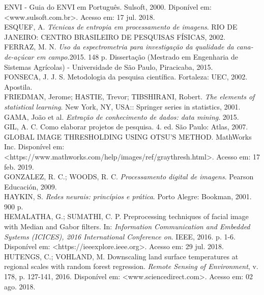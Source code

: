 \noindent ENVI - Guia do ENVI em Português. Sulsoft, 2000. Diponível em: <www.sulsoft.com.br>. Acesso em: 17 jul. 2018.
\\

\noindent ESQUEF, A. \textit{Técnicas de entropia em processamento de imagens}. RIO DE JANEIRO: CENTRO BRASILEIRO DE PESQUISAS FÍSICAS, 2002.
\\

\noindent FERRAZ, M. N. \textit{Uso da espectrometria para investigação da qualidade da cana-de-açúcar em campo.}2015. 148 p. Dissertação (Mestrado em Engenharia de Sistemas Agrícolas) - Universidade de São Paulo, Piracicaba, 2015.
\\

\noindent FONSECA, J. J. S. Metodologia da pesquisa científica. Fortaleza: UEC, 2002. Apostila.
\\

\noindent FRIEDMAN, Jerome; HASTIE, Trevor; TIBSHIRANI, Robert. \textit{The elements of statistical learning}. New York, NY, USA:: Springer series in statistics, 2001.
\\

\noindent GAMA, João et al. \textit{Extração de conhecimento de dados: data mining}. 2015.
\\

\noindent GIL, A. C. Como elaborar projetos de pesquisa. 4. ed. São Paulo: Atlas, 2007.
\\

\noindent GLOBAL IMAGE THRESHOLDING USING OTSU'S METHOD. MathWorks Inc. Disponível em: <https://www.mathworks.com/help/images/ref/graythresh.html>. Acesso em: 17 feb. 2019.
\\

\noindent GONZALEZ, R. C.; WOODS, R. C. \textit{Processamento digital de imagens}. Pearson Educación, 2009.
\\

\noindent HAYKIN, S. \textit{Redes neurais: princípios e prática}. Porto Alegre: Bookman, 2001. 900 p.
\\

\noindent HEMALATHA, G.; SUMATHI, C. P. Preprocessing techniques of facial image with Median and Gabor filters. In: \textit{Information Communication and Embedded Systems (ICICES), 2016 International Conference on}. IEEE, 2016. p. 1-6. Disponível em: <https://ieeexplore.ieee.org>. Acesso em: 29 jul. 2018.
\\

\noindent HUTENGS, C.; VOHLAND, M. Downscaling land surface temperatures at regional scales with random forest regression. \textit{Remote Sensing of Environment}, v. 178, p. 127-141, 2016. Disponível em: <www.sciencedirect.com>. Acesso em: 02 ago. 2018.
\\

